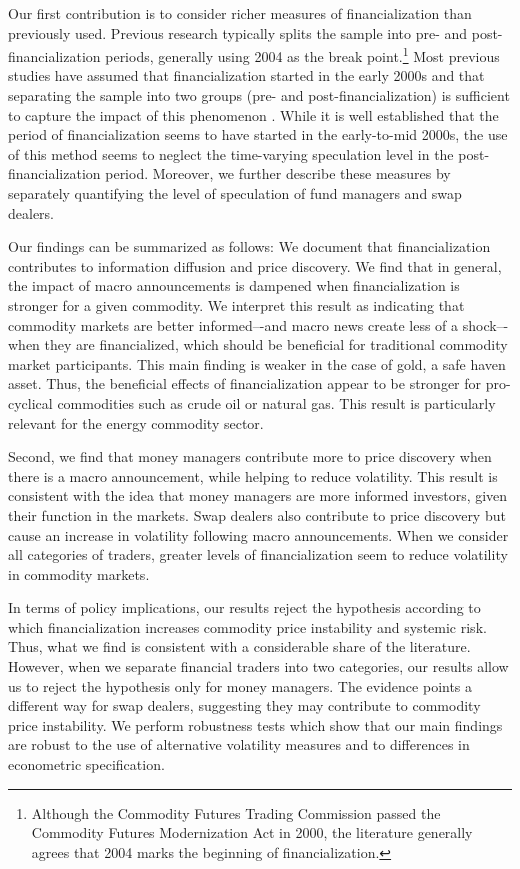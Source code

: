 \documentclass[12pt]{article}
\begin{document}
Our first contribution is to consider richer measures of financialization than previously used. Previous research typically splits the sample into pre- and post-financialization periods, generally using 2004 as the break point.\footnote{Although the Commodity Futures Trading Commission passed the Commodity Futures Modernization Act in 2000, the literature generally agrees that 2004 marks the beginning of financialization.} Most previous studies have assumed that financialization started in the early 2000s and that separating the sample into two groups (pre- and post-financialization) is sufficient to capture the impact of this phenomenon \citep{buyukcsahin2010matters, kilian2014role,brunetti2016speculators,irwin2012financialization,stoll2010commodity,alquist2013role}. While it is well established that the period of financialization seems to have started in the early-to-mid 2000s, the use of this method seems to neglect the time-varying speculation level in the post-financialization period. Moreover, we further describe these measures by separately quantifying the level of speculation of fund managers and swap dealers.

 Our findings can be summarized as follows: We document that financialization contributes to information diffusion and price discovery. We find that in general, the impact of macro announcements is dampened when financialization is stronger for a given commodity. We interpret this result as indicating that commodity markets are better informed–-and macro news create less of a shock–-when they are financialized, which should be beneficial for traditional commodity market participants. This main finding is weaker in the case of gold, a safe haven asset. Thus, the beneficial effects of financialization appear to be stronger for pro-cyclical commodities such as crude oil or natural gas. This result is particularly relevant for the energy commodity sector. 

Second, we find that money managers contribute more to price discovery when there is a macro announcement, while helping to reduce volatility. This result is consistent with the idea that money managers are more informed investors, given their function in the markets. Swap dealers also contribute to price discovery but  cause an increase in volatility following macro announcements. When we consider all categories of traders, greater levels of financialization seem to reduce  volatility in commodity markets. 

In terms of policy implications, our results reject the \citet{masters2009testimony} hypothesis according to which  financialization increases commodity price instability and systemic risk. Thus, what we find is consistent with a considerable share of the literature. However, when we separate financial traders into two categories, our results allow us to reject  the \citet{masters2009testimony} hypothesis only for money managers. The evidence points a different way for swap dealers, suggesting they may contribute to commodity price instability. We perform robustness tests which show that our main findings are robust to the use of alternative volatility measures and to differences in econometric specification.
\end{document}
